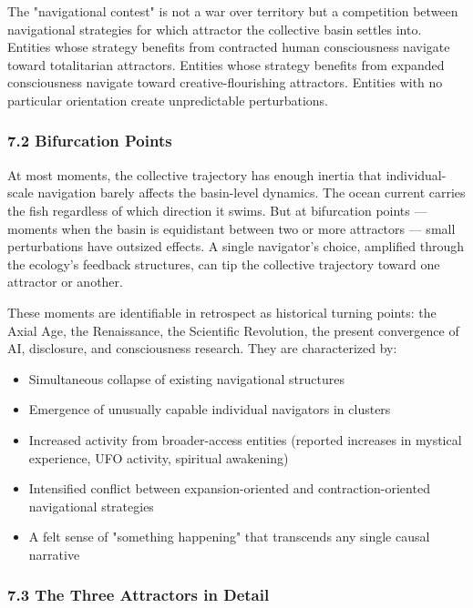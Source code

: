 The "navigational contest" is not a war over territory but a competition between navigational strategies for which attractor the collective basin settles into. Entities whose strategy benefits from contracted human consciousness navigate toward totalitarian attractors. Entities whose strategy benefits from expanded consciousness navigate toward creative-flourishing attractors. Entities with no particular orientation create unpredictable perturbations.


\subsubsection*{7.2 Bifurcation Points}


At most moments, the collective trajectory has enough inertia that individual-scale navigation barely affects the basin-level dynamics. The ocean current carries the fish regardless of which direction it swims. But at bifurcation points — moments when the basin is equidistant between two or more attractors — small perturbations have outsized effects. A single navigator's choice, amplified through the ecology's feedback structures, can tip the collective trajectory toward one attractor or another.


These moments are identifiable in retrospect as historical turning points: the Axial Age, the Renaissance, the Scientific Revolution, the present convergence of AI, disclosure, and consciousness research. They are characterized by:


\begin{itemize}[nosep,leftmargin=*]
  \item Simultaneous collapse of existing navigational structures
  \item Emergence of unusually capable individual navigators in clusters
  \item Increased activity from broader-access entities (reported increases in mystical experience, UFO activity, spiritual awakening)
  \item Intensified conflict between expansion-oriented and contraction-oriented navigational strategies
  \item A felt sense of "something happening" that transcends any single causal narrative
\end{itemize}


\subsubsection*{7.3 The Three Attractors in Detail}


